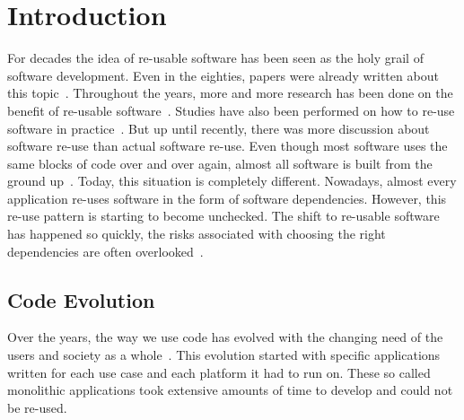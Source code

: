 \chapter{\label{chap:introduction}Introduction}

For decades the idea of re-usable software has been seen as the holy grail of software development. Even in the eighties, papers were already written about this topic~\cite{standish1984essay}. Throughout the years, more and more research has been done on the benefit of re-usable software~\cite{jacobson1997software}. Studies have also been performed on how to re-use software in practice~\cite{reifer1997practical}. But up until recently, there was more discussion about software re-use than actual software re-use. Even though most software uses the same blocks of code over and over again, almost all software is built from the ground up~\cite{frakes2005software}. Today, this situation is completely different. Nowadays, almost every application re-uses software in the form of software dependencies. However, this re-use pattern is starting to become unchecked. The shift to re-usable software has happened so quickly, the risks associated with choosing the right dependencies are often overlooked~\cite{cox2019surviving}. 

\section{Code Evolution}
Over the years, the way we use code has evolved with the changing need of the users and society as a whole~\cite{rajlich2014software}. This evolution started with specific applications written for each use case and each platform it had to run on. These so called monolithic applications took extensive amounts of time to develop and could not be re-used.

